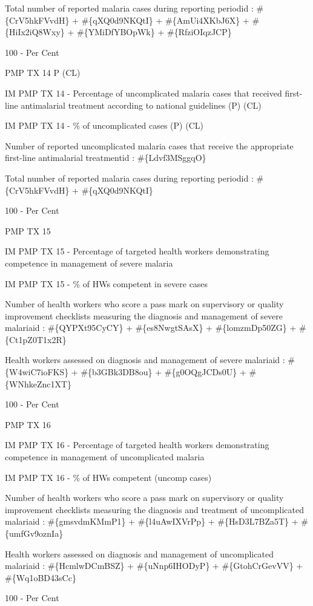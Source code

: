 \documentclass[]{book}
\begin{document}
Total number of reported malaria cases during reporting periodid : \#\{CrV5hkFVvdH\} + \#\{qXQ0d9NKQtI\} + \#\{AmUi4XKbJ6X\} + \#\{HiIx2iQ8Wxy\} + \#\{YMiDfYBOpWk\} + \#\{RfziOIqzJCP\}

100 - Per Cent

PMP TX 14 P (CL)

IM PMP TX 14 - Percentage of uncomplicated malaria cases that received first-line antimalarial treatment according to national guidelines (P) (CL)

IM PMP TX 14 - \% of uncomplicated cases (P) (CL)

Number of reported uncomplicated malaria cases that receive the appropriate first-line antimalarial treatmentid : \#\{Ldvf3MSggqO\}

Total number of reported malaria cases during reporting periodid : \#\{CrV5hkFVvdH\} + \#\{qXQ0d9NKQtI\}

100 - Per Cent

PMP TX 15

IM PMP TX 15 - Percentage of targeted health workers demonstrating competence in management of severe malaria

IM PMP TX 15 - \% of HWs competent in severe cases

Number of health workers who score a pass mark on supervisory or quality improvement checklists measuring the diagnosis and management of severe malariaid : \#\{QYPXt95CyCY\} + \#\{es8NwgtSAsX\} + \#\{lomzmDp50ZG\} + \#\{Ct1pZ0T1x2R\}

Health workers assessed on diagnosis and management of severe malariaid : \#\{W4wiC7ioFKS\} + \#\{b3GBk3DB8ou\} + \#\{g0OQgJCDs0U\} + \#\{WNhkeZnc1XT\}

100 - Per Cent

PMP TX 16

IM PMP TX 16 - Percentage of targeted health workers demonstrating competence in management of uncomplicated malaria

IM PMP TX 16 - \% of HWs competent (uncomp cases)

Number of health workers who score a pass mark on supervisory or quality improvement checklists measuring the diagnosis and treatment of uncomplicated malariaid : \#\{gmsvdmKMmP1\} + \#\{l4uAwIXVrPp\} + \#\{HsD3L7BZa5T\} + \#\{umfGv9oznIa\}

Health workers assessed on diagnosis and management of uncomplicated malariaid : \#\{HcmlwDCmBSZ\} + \#\{uNnp6IHODyP\} + \#\{GtohCrGevVV\} + \#\{Wq1oBD43sCc\}

100 - Per Cent
\end{document}
